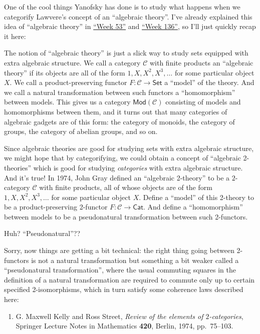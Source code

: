 \documentclass{article}
\def\tightlist{}
\begin{document}
One of the cool things Yanofsky has done is to study what happens when
we categorify Lawvere's concept of an ``algebraic theory''. I've already
explained this idea of ``algebraic theory'' in
\protect\hyperlink{week53}{``Week 53''} and
\protect\hyperlink{week136}{``Week 136''}, so I'll just quickly recap it
here:

The notion of ``algebraic theory'' is just a slick way to study sets
equipped with extra algebraic structure. We call a category
\(\mathcal{C}\) with finite products an ``algebraic theory'' if its
objects are all of the form \(1, X, X^2, X^3, \ldots\) for some
particular object \(X\). We call a product-preserving functor
\(F\colon\mathcal{C}\to\mathsf{Set}\) a ``model'' of the theory. And we
call a natural transformation between such functors a ``homomorphism''
between models. This gives us a category \(\mathsf{Mod}(\mathcal{C})\)
consisting of models and homomorphisms between them, and it turns out
that many categories of algebraic gadgets are of this form: the category
of monoids, the category of groups, the category of abelian groups, and
so on.

Since algebraic theories are good for studying sets with extra algebraic
structure, we might hope that by categorifying, we could obtain a
concept of ``algebraic 2-theories'' which is good for studying
\emph{categories} with extra algebraic structure. And it's true! In
1974, John Gray defined an ``algebraic 2-theory'' to be a \(2\)-category
\(\mathcal{C}\) with finite products, all of whose objects are of the
form \(1, X, X^2, X^3,\ldots\) for some particular object \(X\). Define
a ``model'' of this 2-theory to be a product-preserving 2-functor
\(F\colon\mathcal{C}\to\mathsf{Cat}\). And define a ``homomorphism''
between models to be a pseudonatural transformation between such
2-functors.

Huh? ``Pseudonatural''??

Sorry, now things are getting a bit technical: the right thing going
between 2-functors is not a natural transformation but something a bit
weaker called a ``pseudonatural transformation'', where the usual
commuting squares in the definition of a natural transformation are
required to commute only up to certain specified 2-isomorphisms, which
in turn satisfy some coherence laws described here:

\begin{enumerate}
\def\labelenumi{\arabic{enumi})}
\setcounter{enumi}{5}
\tightlist
\item
  G. Maxwell Kelly and Ross Street, \emph{Review of the elements of
  \(2\)-categories}, Springer Lecture Notes in Mathematics \textbf{420},
  Berlin, 1974, pp.~75--103.
\end{enumerate}
\end{document}
